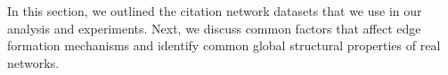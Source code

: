 In this section, we outlined the citation network datasets that we use in our analysis and experiments.
Next, we discuss common factors that affect edge formation mechanisms and identify common global structural
properties of real networks.

